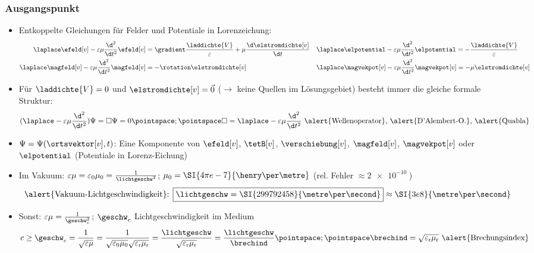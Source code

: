 \begin{frame}
  \frametitle{Ausgangspunkt}
  \begin{itemize}[<+->]
  \item Entkoppelte Gleichungen für Felder und Potentiale in \alert{Lorenzeichung}:
    \begin{align*}
      \laplace \efeld[v]-\varepsilon\mu \frac{\d^2}{\d t^2}\efeld[v] &= \gradient \frac{\laddichte{V}}{\varepsilon}+\mu \frac{\d \elstromdichte[v]}{\d t} && \laplace\elpotential-\varepsilon\mu \frac{\d^2}{\d t^2}\elpotential = -\frac{\laddichte{V}}{\varepsilon}\\
      \laplace\magfeld[v]-\varepsilon\mu\frac{\d^2}{\d t^2}\magfeld[v]& = -\rotation\elstromdichte[v] && \laplace\magvekpot[v]-\varepsilon\mu \frac{\d^2}{\d t^2}\magvekpot[v] = -\mu \elstromdichte[v]
      \end{align*}
  \item Für \(\laddichte{V}=0\) und \(\elstromdichte[v]=\vec{0}\) (\(\rightarrow\) keine Quellen im Lösungsgebiet) besteht immer die gleiche formale Struktur:
\begin{equation*}
(\laplace -\varepsilon\mu\frac{\d^2}{\d t^2})\Psi = \square\Psi = 0\pointspace ; \pointspace \square = \laplace - \varepsilon\mu\frac{\d^2}{\d t^2} \text{ \alert{Wellenoperator}, \alert{D'Alembert-O.}, \alert{Quabla}} 
\end{equation*}    
\item   \(\Psi = \Psi(\ortsvektor[v], t)\): Eine Komponente von \(\efeld[v]\), \(\tetB[v]\), \(\verschiebung[v]\), \(\magfeld[v]\), \(\magvekpot[v]\) oder \(\elpotential\) (Potentiale in Lorenz-Eichung)
\item Im Vakuum: \(\varepsilon\mu = \varepsilon_0 \mu_0 = \frac{1}{\lichtgeschw^2}\); \(\mu_0 = \SI{4\pi e-7}{\henry\per\metre}\) (rel. Fehler \(\approx \SI{2e-10}{}\))
 \begin{equation*}
 \text{\alert{Vakuum-Lichtgeschwindigkeit}: }\boxed{\lichtgeschw = \SI{299792458}{\metre\per\second}} \approx \SI{3e8}{\metre\per\second}
\end{equation*}
\item Sonst: \(\varepsilon\mu = \frac{1}{\geschw_{c}^2}\); \(\geschw_{c}\) Lichtgeschwindigkeit im Medium
 \begin{equation*}
c\ge \geschw_{c} = \frac{1}{\sqrt{\varepsilon\mu}} = \frac{1}{\sqrt{\varepsilon_0\mu_0}\sqrt{\varepsilon_\mathrm{r}\mu_\mathrm{r}}} = \frac{\lichtgeschw}{\sqrt{\varepsilon_\mathrm{r}\mu_\mathrm{r}}} =\frac{\lichtgeschw}{\brechind} \pointspace ; \pointspace \brechind = \sqrt{\varepsilon_\mathrm{r}\mu_\mathrm{r}} \text{ \alert{Brechungsindex}}
\end{equation*}
  \end{itemize}
\end{frame}


